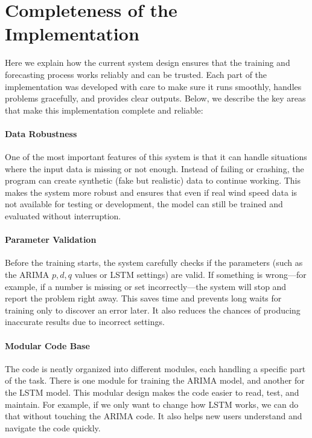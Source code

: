 \section{Completeness of the Implementation}

Here we explain how  the current system design ensures that the training and forecasting process works reliably and can be trusted. Each part of the implementation was developed with care to make sure it runs smoothly, handles problems gracefully, and provides clear outputs. Below, we describe the key areas that make this implementation complete and reliable:

\paragraph{Data Robustness} 
One of the most important features of this system is that it can handle situations where the input data is missing or not enough. Instead of failing or crashing, the program can create synthetic (fake but realistic) data to continue working. This makes the system more robust and ensures that even if real wind speed data is not available for testing or development, the model can still be trained and evaluated without interruption.

\paragraph{Parameter Validation} 
Before the training starts, the system carefully checks if the parameters (such as the ARIMA \(p, d, q\) values or LSTM settings) are valid. If something is wrong—for example, if a number is missing or set incorrectly—the system will stop and report the problem right away. This saves time and prevents long waits for training only to discover an error later. It also reduces the chances of producing inaccurate results due to incorrect settings.

\paragraph{Modular Code Base} 
The code is neatly organized into different modules, each handling a specific part of the task. There is one module for training the ARIMA model, and another for the LSTM model. This modular design makes the code easier to read, test, and maintain. For example, if we only want to change how LSTM works, we can do that without touching the ARIMA code. It also helps new users understand and navigate the code quickly.

